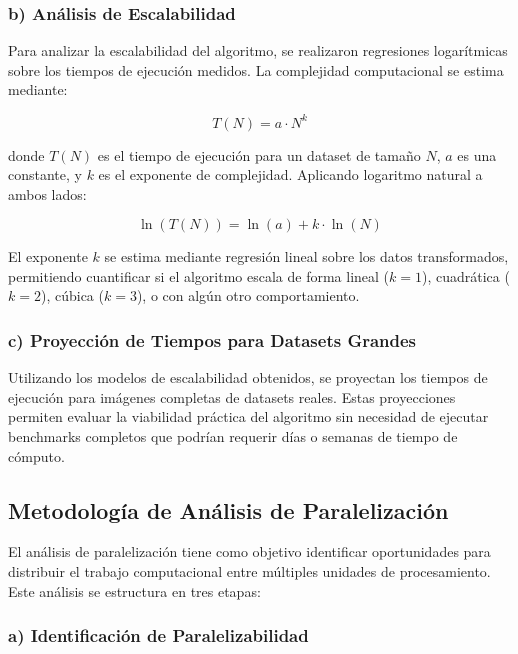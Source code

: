 \subsubsection{b) Análisis de Escalabilidad}

Para analizar la escalabilidad del algoritmo, se realizaron regresiones logarítmicas sobre los tiempos de ejecución medidos. La complejidad computacional se estima mediante:

\begin{equation}
    T(N) = a \cdot N^k
\end{equation}

donde $T(N)$ es el tiempo de ejecución para un dataset de tamaño $N$, $a$ es una constante, y $k$ es el exponente de complejidad. Aplicando logaritmo natural a ambos lados:

\begin{equation}
    \ln(T(N)) = \ln(a) + k \cdot \ln(N)
\end{equation}

El exponente $k$ se estima mediante regresión lineal sobre los datos transformados, permitiendo cuantificar si el algoritmo escala de forma lineal ($k=1$), cuadrática ($k=2$), cúbica ($k=3$), o con algún otro comportamiento.

\subsubsection{c) Proyección de Tiempos para Datasets Grandes}

Utilizando los modelos de escalabilidad obtenidos, se proyectan los tiempos de ejecución para imágenes completas de datasets reales. Estas proyecciones permiten evaluar la viabilidad práctica del algoritmo sin necesidad de ejecutar benchmarks completos que podrían requerir días o semanas de tiempo de cómputo.

\subsection{Metodología de Análisis de Paralelización}

El análisis de paralelización tiene como objetivo identificar oportunidades para distribuir el trabajo computacional entre múltiples unidades de procesamiento. Este análisis se estructura en tres etapas:

\subsubsection{a) Identificación de Paralelizabilidad}

